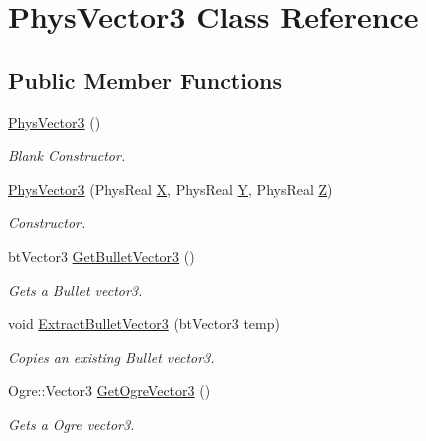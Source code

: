 \hypertarget{classPhysVector3}{
\section{PhysVector3 Class Reference}
\label{da/d11/classPhysVector3}
}
\subsection*{Public Member Functions}
\begin{DoxyCompactItemize}
\item 
\hyperlink{classPhysVector3_a0d68895a6479ed7f875f666ce381afba}{PhysVector3} ()
\begin{DoxyCompactList}\small\item\em Blank Constructor. \item\end{DoxyCompactList}\item 
\hyperlink{classPhysVector3_aad8161121a45b20dde0e3cc6959801be}{PhysVector3} (PhysReal \hyperlink{classPhysVector3_ac4586254a6116c616046bd9d5b35ca31}{X}, PhysReal \hyperlink{classPhysVector3_a9bf4609392a492c2b3e278d635ed976a}{Y}, PhysReal \hyperlink{classPhysVector3_a0c0585976cb4c215626e205a2c663226}{Z})
\begin{DoxyCompactList}\small\item\em Constructor. \item\end{DoxyCompactList}\item 
btVector3 \hyperlink{classPhysVector3_adfc5f9e933a94be994ce5ce0c38d1f96}{GetBulletVector3} ()
\begin{DoxyCompactList}\small\item\em Gets a Bullet vector3. \item\end{DoxyCompactList}\item 
void \hyperlink{classPhysVector3_a71a78da9e8011cb727010f8ba3acf546}{ExtractBulletVector3} (btVector3 temp)
\begin{DoxyCompactList}\small\item\em Copies an existing Bullet vector3. \item\end{DoxyCompactList}\item 
Ogre::Vector3 \hyperlink{classPhysVector3_a01facc2b865bb79c589ed1985dd6c49c}{GetOgreVector3} ()
\begin{DoxyCompactList}\small\item\em Gets a Ogre vector3. \item\end{DoxyCompactList}\item 

\end{DoxyCompactItemize}

